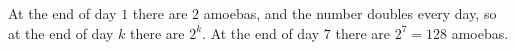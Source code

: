 At the end of day $1$ there are $2$ amoebas, and the number doubles every day, so at the end of day $k$ there are $2^k$. At the end of day $7$ there are $2^7=\boxed{128}$ amoebas.
